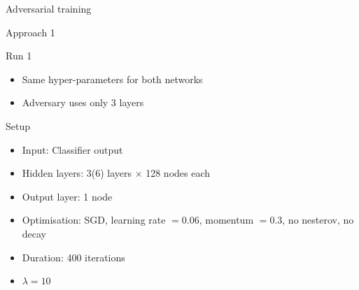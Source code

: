 


\begin{frame}[c]
\begin{center}
\Huge Adversarial training
\end{center}
\end{frame}

\begin{frame}{Approach 1}
    \begin{block}{Run 1}
\begin{itemize}
    \item Same hyper-parameters for both networks
    \item Adversary uses only 3 layers
\end{itemize}
    \end{block}
    \begin{block}{Setup}
    \begin{itemize}
    \item Input: Classifier output
    \item Hidden layers: \num{3}(\num{6}) \ELU layers $\times$ \num{128} nodes each
    \item Output layer: \num{1} \SIGMOID node
    \item Optimisation: SGD, learning rate $=0.06$, momentum $=0.3$, no nesterov, no decay
    \item Duration: 400 iterations
    \item $\lambda = 10$
    \end{itemize}
    \end{block}
\end{frame}

